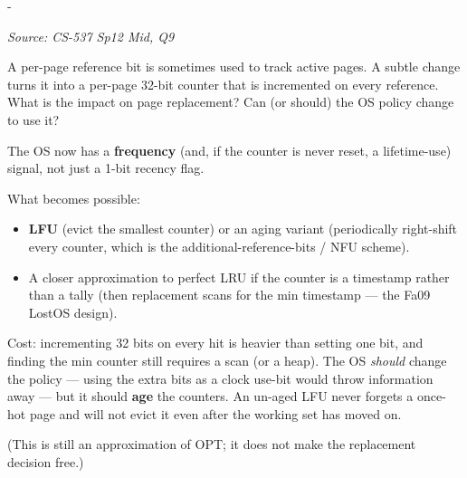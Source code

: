 \documentclass[11pt,a4paper]{article}
\makeatletter
\newcommand{\keepspace}[1]{\par\penalty-100\begingroup
  \setlength{\dimen@}{#1}\dimen@ii\pagegoal\advance\dimen@ii-\pagetotal
  \ifdim\dimen@>\dimen@ii\ifdim\dimen@ii>\z@\vfil\fi\break\fi\endgroup}
\newcounter{qn}[section]
\newenvironment{Qn}[4]{%
  \refstepcounter{qn}\keepspace{7\baselineskip}%
  \begin{tcolorbox}[qboxstyle, title={Q\thesection.\theqn\ \ [#1 \textbar\ #2]\ \ #4}]%
  {\footnotesize\color{g3}\textit{Source: #3}}\par\smallskip%
}{%
  \end{tcolorbox}%
}
\newenvironment{Sol}{%
  \begin{tcolorbox}[sboxstyle, title={Solution}]%
}{%
  \end{tcolorbox}\vspace{0.35em}%
}
\makeatother
\begin{document}
\begin{Qn}{Medium}{Lect 15}{CS-537 Sp12 Mid, Q9}{A 32-bit reference counter instead of a reference bit}
A per-page reference bit is sometimes used to track active pages. A
subtle change turns it into a per-page 32-bit counter that is
incremented on every reference. What is the impact on page replacement?
Can (or should) the OS policy change to use it?
\end{Qn}
\begin{Sol}
The OS now has a \textbf{frequency} (and, if the counter is never
reset, a lifetime-use) signal, not just a 1-bit recency flag.

What becomes possible:
\begin{itemize}
  \item \textbf{LFU} (evict the smallest counter) or an aging variant
        (periodically right-shift every counter, which is the
        additional-reference-bits / NFU scheme).
  \item A closer approximation to perfect LRU if the counter is a
        timestamp rather than a tally (then replacement scans for the
        min timestamp --- the Fa09 LostOS design).
\end{itemize}
Cost: incrementing 32 bits on every hit is heavier than setting one
bit, and finding the min counter still requires a scan (or a heap).
The OS \emph{should} change the policy --- using the extra bits as a
clock use-bit would throw information away --- but it should
\textbf{age} the counters. An un-aged LFU never forgets a once-hot page
and will not evict it even after the working set has moved on.

(This is still an approximation of OPT; it does not make the
replacement decision free.)
\end{Sol}
\end{document}
